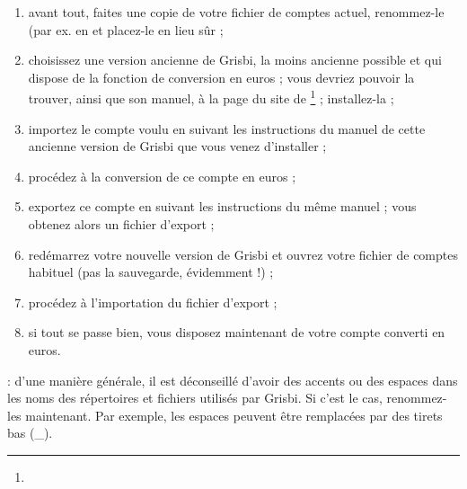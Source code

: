 \begin{enumerate}
	 \item avant tout, faites une copie de votre fichier de comptes actuel, renommez-le (par ex. en  et placez-le en lieu sûr ;
	 \item choisissez une version ancienne de Grisbi, la moins ancienne possible 	et qui dispose de la fonction de conversion en euros ; vous devriez pouvoir la trouver, ainsi que son manuel, à la page du site de \footnote{\urlGrisbi{}} ; installez-la ;
	 \item importez le compte voulu en suivant les instructions du manuel de cette ancienne version de Grisbi que vous venez d'installer ;
	 \item procédez à la conversion de ce compte en euros ;
	 \item exportez ce compte en suivant les instructions du même manuel ; vous obtenez alors un fichier d'export ;
	 \item redémarrez votre nouvelle version de Grisbi et ouvrez votre fichier de comptes habituel (pas la sauvegarde, évidemment !) ;
	 \item procédez à l'importation du fichier d'export ;
	 \item si tout se passe bien, vous disposez maintenant de votre compte converti en euros.
\end{enumerate}

 : d'une manière générale, il est déconseillé d'avoir des accents ou des espaces dans les noms des répertoires et fichiers utilisés par Grisbi. Si c'est le cas, renommez-les maintenant. Par exemple, les espaces peuvent être remplacées par des tirets bas (\_). 

